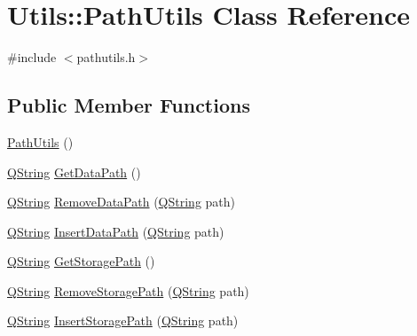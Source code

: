 \hypertarget{class_utils_1_1_path_utils}{\section{Utils\-:\-:Path\-Utils Class Reference}
\label{class_utils_1_1_path_utils}
}


{\ttfamily \#include $<$pathutils.\-h$>$}

\subsection*{Public Member Functions}
\begin{DoxyCompactItemize}
\item 
\hyperlink{class_utils_1_1_path_utils_a0d137a581101db5751430035e4902d87}{Path\-Utils} ()
\item 
\hyperlink{group___u_a_v_objects_plugin_gab9d252f49c333c94a72f97ce3105a32d}{Q\-String} \hyperlink{class_utils_1_1_path_utils_a48d01eb74f2c41cf8933fdfcc2b75974}{Get\-Data\-Path} ()
\item 
\hyperlink{group___u_a_v_objects_plugin_gab9d252f49c333c94a72f97ce3105a32d}{Q\-String} \hyperlink{class_utils_1_1_path_utils_ae13b2f08493b1d7ba3d640796a34a5c6}{Remove\-Data\-Path} (\hyperlink{group___u_a_v_objects_plugin_gab9d252f49c333c94a72f97ce3105a32d}{Q\-String} path)
\item 
\hyperlink{group___u_a_v_objects_plugin_gab9d252f49c333c94a72f97ce3105a32d}{Q\-String} \hyperlink{class_utils_1_1_path_utils_ac0b4cac7c56d6239e1dfe637e3982dfb}{Insert\-Data\-Path} (\hyperlink{group___u_a_v_objects_plugin_gab9d252f49c333c94a72f97ce3105a32d}{Q\-String} path)
\item 
\hyperlink{group___u_a_v_objects_plugin_gab9d252f49c333c94a72f97ce3105a32d}{Q\-String} \hyperlink{class_utils_1_1_path_utils_ac8a4ac1453876aedf665dac78b3b0f0b}{Get\-Storage\-Path} ()
\item 
\hyperlink{group___u_a_v_objects_plugin_gab9d252f49c333c94a72f97ce3105a32d}{Q\-String} \hyperlink{class_utils_1_1_path_utils_a6e03d8cb95a79c0f70f530d43d5733d4}{Remove\-Storage\-Path} (\hyperlink{group___u_a_v_objects_plugin_gab9d252f49c333c94a72f97ce3105a32d}{Q\-String} path)
\item 
\hyperlink{group___u_a_v_objects_plugin_gab9d252f49c333c94a72f97ce3105a32d}{Q\-String} \hyperlink{class_utils_1_1_path_utils_a58a574f94e7fde2e7746820edba96ce2}{Insert\-Storage\-Path} (\hyperlink{group___u_a_v_objects_plugin_gab9d252f49c333c94a72f97ce3105a32d}{Q\-String} path)
\end{DoxyCompactItemize}


